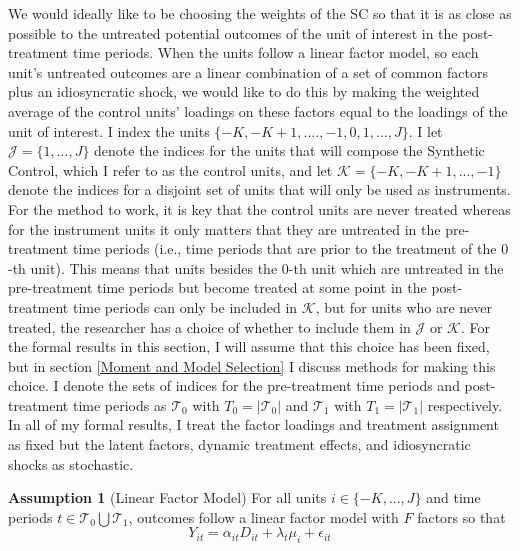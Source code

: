 \documentclass{article}
\begin{document}
 We would ideally like to be choosing the weights of the SC so that it is as close as possible to the untreated potential outcomes of the unit of interest in the post-treatment time periods. When the units follow a linear factor model, so each unit's untreated outcomes are a linear combination of a set of common factors plus an idiosyncratic shock, we would like to do this by making the weighted average of the control units' loadings on these factors equal to the loadings of the unit of interest. I index the units $\{-K, -K+1, ...., -1, 0, 1,...,J\}$. I let $\mathcal{J} = \{1,...,J\}$ denote the indices for the units that will compose the Synthetic Control, which I refer to as the control units, and let $\mathcal{K} = \{-K, -K+1,..., -1\}$ denote the indices for a disjoint set of units that will only be used as instruments. For the method to work, it is key that the control units are never treated whereas for the instrument units it only matters that they are untreated in the pre-treatment time periods (i.e., time periods that are prior to the treatment of the $0$-th unit). This means that units besides the $0$-th unit which are untreated in the pre-treatment time periods but become treated at some point in the post-treatment time periods can only be included in $\mathcal{K}$, but for units who are never treated, the researcher has a choice of whether to include them in $\mathcal{J}$ or $\mathcal{K}$. For the formal results in this section, I will assume that this choice has been fixed, but in section \ref{Moment and Model Selection} I discuss methods for making this choice. I denote the sets of indices for the pre-treatment time periods and post-treatment time periods as $\mathcal{T}_0$ with $T_0 = |\mathcal{T}_0|$ and $\mathcal{T}_1$ with $T_1 = |\mathcal{T}_1|$ respectively. In all of my formal results, I treat the factor loadings and treatment assignment as fixed but the latent factors, dynamic treatment effects, and idiosyncratic shocks as stochastic. 

\textbf{Assumption 1} \label{A1} (Linear Factor Model) For all units $i \in \{ -K,...,J\}$ and time periods $t \in \mathcal{T}_0\bigcup \mathcal{T}_1$, outcomes follow a linear factor model with $F$ factors so that
\begin{equation*}
    Y_{it} = \alpha_{it} D_{it} + \lambda_t \mu_i  + \epsilon_{it} 
\end{equation*}
\end{document}
